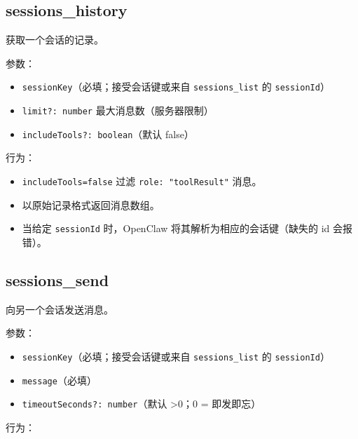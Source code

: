 \subsection{sessions\_history}


获取一个会话的记录。

参数：

\begin{itemize}
  \item \texttt{sessionKey}（必填；接受会话键或来自 \texttt{sessions\_list} 的 \texttt{sessionId}）
  \item \texttt{limit?: number} 最大消息数（服务器限制）
  \item \texttt{includeTools?: boolean}（默认 false）
\end{itemize}


行为：

\begin{itemize}
  \item \texttt{includeTools=false} 过滤 \texttt{role: "toolResult"} 消息。
  \item 以原始记录格式返回消息数组。
  \item 当给定 \texttt{sessionId} 时，OpenClaw 将其解析为相应的会话键（缺失的 id 会报错）。
\end{itemize}


\subsection{sessions\_send}


向另一个会话发送消息。

参数：

\begin{itemize}
  \item \texttt{sessionKey}（必填；接受会话键或来自 \texttt{sessions\_list} 的 \texttt{sessionId}）
  \item \texttt{message}（必填）
  \item \texttt{timeoutSeconds?: number}（默认 >0；0 = 即发即忘）
\end{itemize}


行为：

